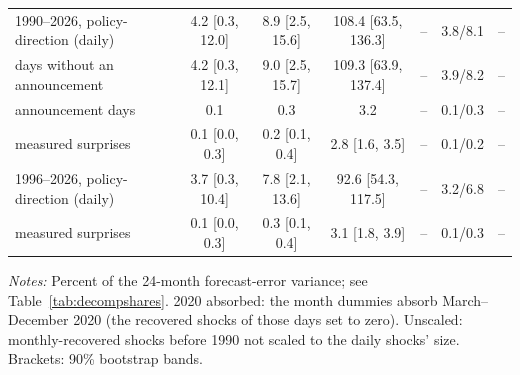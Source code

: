 \begin{table}[tp]
{\begin{tabular}{lcccccc}
1990--2026, policy-direction (daily) & 4.2 {\scriptsize [0.3, 12.0]} & 8.9 {\scriptsize [2.5, 15.6]} & 108.4 {\scriptsize [63.5, 136.3]} & -- & 3.8/8.1 & --\\
\quad days without an announcement & 4.2 {\scriptsize [0.3, 12.1]} & 9.0 {\scriptsize [2.5, 15.7]} & 109.3 {\scriptsize [63.9, 137.4]} & -- & 3.9/8.2 & --\\
\quad announcement days & 0.1 & 0.3 & 3.2 & -- & 0.1/0.3 & --\\
\quad measured surprises & 0.1 {\scriptsize [0.0, 0.3]} & 0.2 {\scriptsize [0.1, 0.4]} & 2.8 {\scriptsize [1.6, 3.5]} & -- & 0.1/0.2 & --\\
1996--2026, policy-direction (daily) & 3.7 {\scriptsize [0.3, 10.4]} & 7.8 {\scriptsize [2.1, 13.6]} & 92.6 {\scriptsize [54.3, 117.5]} & -- & 3.2/6.8 & --\\
\quad measured surprises & 0.1 {\scriptsize [0.0, 0.3]} & 0.3 {\scriptsize [0.1, 0.4]} & 3.1 {\scriptsize [1.8, 3.9]} & -- & 0.1/0.3 & --\\
\bottomrule\end{tabular}}
\begin{flushleft}\footnotesize\textit{Notes:} Percent of the 24-month forecast-error variance; see Table~\ref{tab:decompshares}. 2020 absorbed: the month dummies absorb March--December 2020 (the recovered shocks of those days set to zero). Unscaled: monthly-recovered shocks before 1990 not scaled to the daily shocks' size. Brackets: 90\% bootstrap bands.\end{flushleft}
\end{table}
